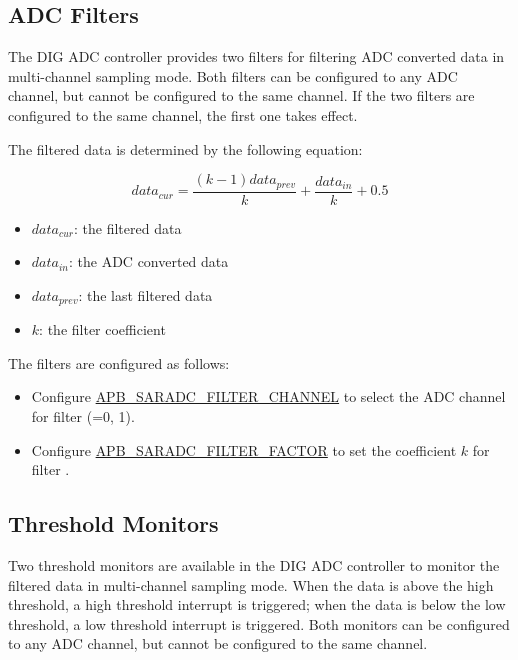 \documentclass[main\_\_EN.tex]{subfiles}
\begin{document}
\subsection{ADC Filters}\label{sec:adc_filter}

The DIG ADC controller provides two filters for filtering ADC converted data in multi-channel sampling mode. Both filters can be configured to any ADC channel, but cannot be configured to the same channel. If the two filters are configured to the same channel, the first one takes effect.

The filtered data is determined by the following equation:

\[data_{cur} = \frac{(k-1)data_{prev}}{k}+\frac{data_{in}}{k}+0.5\]

\begin{itemize}
    \item \(data_{cur}\): the filtered data
    \item \(data_{in}\): the ADC converted data
    \item \(data_{prev}\): the last filtered data
    \item \(k\): the filter coefficient
\end{itemize}

The filters are configured as follows:

\begin{itemize}
\item Configure \hyperref[fielddesc:APBSARADCFILTERCHANNEL1]{APB\_SARADC\_FILTER\_CHANNEL} to select the ADC channel for filter  (=0, 1).
\item Configure \hyperref[fielddesc:APBSARADCFILTERFACTOR1]{APB\_SARADC\_FILTER\_FACTOR} to set the coefficient \(k\) for filter .
\end{itemize}

\subsection{Threshold Monitors}\label{sec:adc_threshold}

Two threshold monitors are available in the DIG ADC controller to monitor the filtered data in multi-channel sampling mode. When the data is above the high threshold, a high threshold interrupt is triggered; when the data is below the low threshold, a low threshold interrupt is triggered. Both monitors can be configured to any ADC channel, but cannot be configured to the same channel.
\end{document}

